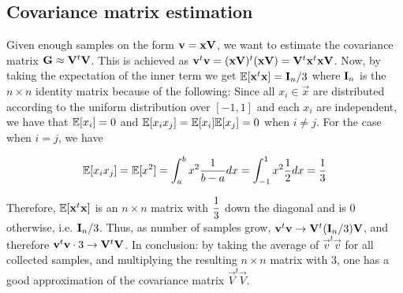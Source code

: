 \subsection{Covariance matrix estimation}
Given enough samples on the form $\mathbf{v} = \mathbf{x}\mathbf{V} $, we want to estimate the covariance matrix $\mathbf{G} \approx \mathbf{V}^t \mathbf{V}$.
This is achieved as $\mathbf{v}^t \mathbf{v} = ( \mathbf{x}\mathbf{V})^t(\mathbf{x}\mathbf{V}) = \mathbf{V}^t \mathbf{x}^t \mathbf{x} \mathbf{V}$.
Now, by taking the expectation of the inner term we get $\mathbb{E}[\mathbf{x}^t \mathbf{x}] = \mathbf{I}_n / 3$ where $\mathbf{I}_n$ is the $n \times n$ identity matrix because of the following:
Since all $x_i \in \vec{x}$ are distributed according to the uniform distribution over $[-1, 1]$ and each $x_i$ are independent, 
we have that $\mathbb{E}[x_i] = 0$ and $\mathbb{E}[x_i x_j] = \mathbb{E}[x_i] \mathbb{E}[x_j] = 0$ when $i \neq j$.
For the case when $i = j$, we have 

\[\mathbb{E}[x_i x_j] = \mathbb{E}[x ^2] = \int_{a}^{b} x^2 \frac{1}{b-a} dx = \int_{-1}^{1} x^2 \frac{1}{2} dx = \frac{1}{3}\]

Therefore, $\mathbb{E}[\mathbf{x}^t \mathbf{x}]$ is an $n \times n$ matrix with $\mathlarger{\frac{1}{3}}$ down the diagonal and is 0 otherwise, i.e. $\mathbf{I}_n / 3$.
Thus, as number of samples grow, $\mathbf{v} ^t \mathbf{v} \rightarrow \mathbf{V}^t (\mathbf{I}_n / 3) \mathbf{V}$, and therefore $\mathbf{v}^t \mathbf{v} \cdot 3 \rightarrow \mathbf{V}^t \mathbf{V}$.
In conclusion: by taking the average of $\vec{v}^t \vec{v}$ for all collected samples, and multiplying the resulting $n \times n$ matrix with $3$, one 
has a good approximation of the covariance matrix $\vec{V}^t \vec{V}$.
